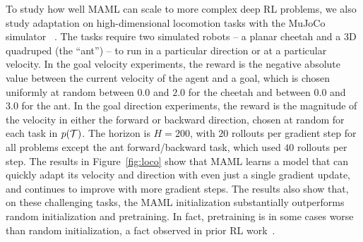 \documentclass{article}
\begin{document}

\vspace{-0.1cm}
To study how well MAML can scale to more complex deep RL problems, we also study adaptation on high-dimensional locomotion tasks with the MuJoCo simulator ~\cite{mujoco}. The tasks require two simulated robots -- a planar cheetah and a 3D quadruped (the ``ant'') -- to run in a particular direction or at a particular velocity. In the goal velocity experiments, the reward is the negative absolute value between the current velocity of the agent and a goal, which is chosen uniformly at random between $0.0$ and $2.0$ for the cheetah and between $0.0$ and $3.0$ for the ant. In the goal direction experiments, the reward is the magnitude of the velocity in either the forward or backward direction, chosen at random for each task in $p(\mathcal{T})$. The horizon is $H=200$, with $20$ rollouts per gradient step for all problems except the ant forward/backward task, which used $40$ rollouts per step. The results in Figure~\ref{fig:loco} show that MAML learns a model that can quickly adapt its velocity and direction with even just a single gradient update, and continues to improve with more gradient steps. The results also show that, on these challenging tasks, the MAML initialization substantially outperforms random initialization and pretraining. In fact, pretraining is in some cases worse than random initialization, a fact observed in prior RL work~\cite{actormimic}.

\end{document}
